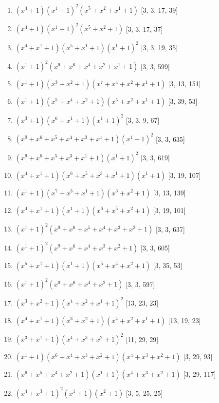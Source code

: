 \documentclass[10pt,twocolumn]{article}
\begin{document}
\begin{enumerate}
\item $(x^{4} + 1)(x^{1} + 1)^{2}(x^{5} + x^{2} + x^{1} + 1)$  [3, 3, 17, 39]
\item $(x^{4} + 1)(x^{1} + 1)^{2}(x^{5} + x^{2} + 1)$  [3, 3, 17, 37]
\item $(x^{4} + x^{1} + 1)(x^{5} + x^{1} + 1)(x^{1} + 1)^{2}$  [3, 3, 19, 35]
\item $(x^{1} + 1)^{2}(x^{9} + x^{6} + x^{4} + x^{2} + x^{1} + 1)$  [3, 3, 599]
\item $(x^{1} + 1)(x^{3} + x^{2} + 1)(x^{7} + x^{4} + x^{2} + x^{1} + 1)$  [3, 13, 151]
\item $(x^{1} + 1)(x^{5} + x^{4} + x^{2} + 1)(x^{5} + x^{2} + x^{1} + 1)$  [3, 39, 53]
\item $(x^{3} + 1)(x^{6} + x^{1} + 1)(x^{1} + 1)^{2}$  [3, 3, 9, 67]
\item $(x^{9} + x^{6} + x^{5} + x^{4} + x^{3} + x^{1} + 1)(x^{1} + 1)^{2}$  [3, 3, 635]
\item $(x^{9} + x^{6} + x^{5} + x^{3} + x^{1} + 1)(x^{1} + 1)^{2}$  [3, 3, 619]
\item $(x^{4} + x^{1} + 1)(x^{6} + x^{5} + x^{3} + x^{1} + 1)(x^{1} + 1)$  [3, 19, 107]
\item $(x^{1} + 1)(x^{7} + x^{3} + x^{1} + 1)(x^{3} + x^{2} + 1)$  [3, 13, 139]
\item $(x^{4} + x^{1} + 1)(x^{1} + 1)(x^{6} + x^{5} + x^{2} + 1)$  [3, 19, 101]
\item $(x^{1} + 1)^{2}(x^{9} + x^{6} + x^{5} + x^{4} + x^{3} + x^{2} + 1)$  [3, 3, 637]
\item $(x^{1} + 1)^{2}(x^{9} + x^{6} + x^{4} + x^{3} + x^{2} + 1)$  [3, 3, 605]
\item $(x^{5} + x^{1} + 1)(x^{1} + 1)(x^{5} + x^{4} + x^{2} + 1)$  [3, 35, 53]
\item $(x^{1} + 1)^{2}(x^{9} + x^{6} + x^{4} + x^{2} + 1)$  [3, 3, 597]
\item $(x^{3} + x^{2} + 1)(x^{4} + x^{2} + x^{1} + 1)^{2}$  [13, 23, 23]
\item $(x^{4} + x^{1} + 1)(x^{3} + x^{2} + 1)(x^{4} + x^{2} + x^{1} + 1)$  [13, 19, 23]
\item $(x^{3} + x^{1} + 1)(x^{4} + x^{3} + x^{2} + 1)^{2}$  [11, 29, 29]
\item $(x^{1} + 1)(x^{6} + x^{4} + x^{3} + x^{2} + 1)(x^{4} + x^{3} + x^{2} + 1)$  [3, 29, 93]
\item $(x^{6} + x^{5} + x^{4} + x^{2} + 1)(x^{1} + 1)(x^{4} + x^{3} + x^{2} + 1)$  [3, 29, 117]
\item $(x^{4} + x^{3} + 1)^{2}(x^{1} + 1)(x^{2} + 1)$  [3, 5, 25, 25]

\end{enumerate}
\end{document}

